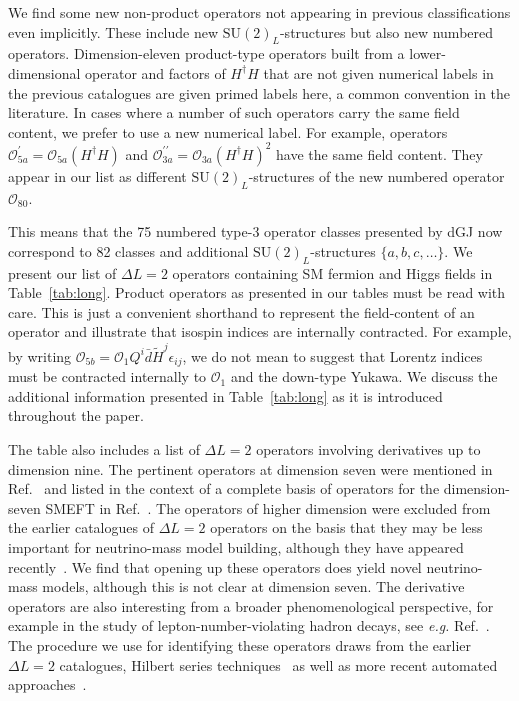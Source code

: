 We find some new non-product operators not appearing in previous classifications
even implicitly. These include new $\mathrm{SU}(2)_L$-structures but also new
numbered operators. Dimension-eleven product-type operators built from a
lower-dimensional operator and factors of $H^\dagger H$ that are not given
numerical labels in the previous catalogues are given primed labels here, a
common convention in the literature. In cases where a number of such operators
carry the same field content, we prefer to use a new numerical label. For
example, operators $\mathcal{O}_{5a}^\prime = \mathcal{O}_{5a} (H^\dagger H)$
and $\mathcal{O}_{3a}^{\prime \prime} = \mathcal{O}_{3a}(H^\dagger H)^2$ have
the same field content. They appear in our list as different
$\mathrm{SU}(2)_L$-structures of the new numbered operator $\mathcal{O}_{80}$.

This means that the 75 numbered type-3 operator classes presented by dGJ now
correspond to 82 classes and additional $\mathrm{SU}(2)_{L}$-structures
$\{a, b, c, \ldots\}$. We present our list of $\Delta L = 2$ operators
containing SM fermion and Higgs fields in Table~\ref{tab:long}. Product
operators as presented in our tables must be read with care. This is just a
convenient shorthand to represent the field-content of an operator and
illustrate that isospin indices are internally contracted. For example, by
writing
$\mathcal{O}_{5b} = \mathcal{O}_{1} Q^{i} \bar{d} \tilde{H}^{j} \epsilon_{ij}$,
we do not mean to suggest that Lorentz indices must be contracted internally to
$\mathcal{O}_{1}$ and the down-type Yukawa. We discuss the additional
information presented in Table~\ref{tab:long} as it is introduced throughout the
paper.

The table also includes a list of $\Delta L = 2$ operators involving derivatives
up to dimension nine. The pertinent operators at dimension seven were mentioned
in Ref.~\cite{Babu:2001ex} and listed in the context of a complete basis of
operators for the dimension-seven SMEFT in Ref.~\cite{Lehman:2014jma}. The
operators of higher dimension were excluded from the earlier catalogues of
$\Delta L = 2$ operators on the basis that they may be less important for
neutrino-mass model building, although they have appeared
recently~\cite{Li:2020xlh}. We find that opening up these operators does yield
novel neutrino-mass models, although this is not clear at dimension seven. The
derivative operators are also interesting from a broader phenomenological
perspective, for example in the study of lepton-number-violating hadron decays,
see \textit{e.g.} Ref.~\cite{Cata:2019wbu}. The procedure we use for identifying
these operators draws from the earlier $\Delta L = 2$ catalogues, Hilbert series
techniques~\cite{Lehman:2015via, Henning:2015daa, Lehman:2015coa,
  Henning:2015alf, Henning:2017fpj} as well as more recent automated
approaches~\cite{Gripaios:2018zrz, Criado:2019ugp, Fonseca:2011sy,
  Fonseca:2017lem, Fonseca:2019yya, Banerjee:2020bym}.

